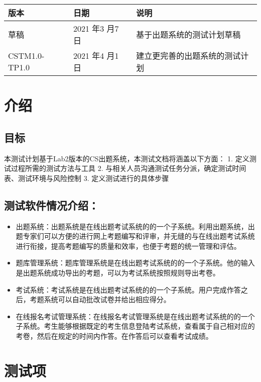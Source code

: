 \documentclass[hyperref, a4paper]{ctexart}
\providecommand{\tightlist}{%
  \setlength{\itemsep}{0pt}\setlength{\parskip}{0pt}}
\begin{document}
\begin{tabular}{|p{2cm}|p{3.3cm}|p{5cm}|}
\hline
版本 & 日期 & 说明\\
\hline
草稿 & 2021 年3 月7 日 & 基于出题系统的测试计划草稿\\
\hline
CSTM1.0-TP1.0 & 2021 年4 月1 日 & 建立更完善的出题系统的测试计划\\
\hline
\end{tabular}

\hypertarget{ux4ecbux7ecd}{%
\section{介绍}\label{ux4ecbux7ecd}}

\hypertarget{ux76eeux6807}{%
\subsection{目标}\label{ux76eeux6807}}

本测试计划基于Lab2版本的CS出题系统，本测试文档将涵盖以下方面： 1.
定义测试过程所需的测试方法与工具 2.
与相关人员沟通测试任务分派，确定测试时间表、测试环境与风险控制 3.
定义测试进行的具体步骤

\hypertarget{ux6d4bux8bd5ux8f6fux4ef6ux60c5ux51b5ux4ecbux7ecd}{%
\subsection{测试软件情况介绍：}\label{ux6d4bux8bd5ux8f6fux4ef6ux60c5ux51b5ux4ecbux7ecd}}

\begin{itemize}
\tightlist
\item
  出题系统：出题系统是在线出题考试系统的的⼀个⼦系统。利⽤出题系统，出题专家们可以⽅便的进⾏⽹上考题编写和评审，并⽆缝的与在线出题考试系统进⾏衔接，提⾼考题编写的质量和效率，也便于考题的统⼀管理和评估。
\item
  题库管理系统：题库管理系统是在线出题考试系统的的⼀个⼦系统。他的输⼊是出题系统成功导出的考题，可以为考试系统按照规则导出考卷。
\item
  考试系统：考试系统是在线出题考试系统的的⼀个⼦系统。用户完成作答之后，考题系统可以自动批改试卷并给出相应得分。
\item
  在线报名考试管理系统：在线报名考试管理系统是在线出题考试系统的的⼀个⼦系统。考生能够根据既定的考生信息登陆考试系统，查看属于自己相对应的考卷，然后在规定的时间内作答。在作答后可以查看考试成绩。
\end{itemize}

\hypertarget{ux6d4bux8bd5ux9879}{%
\section{测试项}\label{ux6d4bux8bd5ux9879}}
\end{document}
